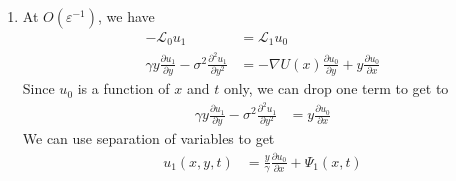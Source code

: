 \documentclass[12pt]{article}
\theoremstyle{plain}
\theoremstyle{definition}
\theoremstyle{remark}
\begin{document}
\begin{enumerate}
\begin{enumerate}
      \item %
        At $O(\varepsilon^{-1})$, we have
        \begin{align*}
          -\mathscr{L}_0u_1 &= \mathscr{L}_1u_0 \\
          \gamma y \frac{\partial u_1}{\partial y}
            -\sigma^2 \frac{\partial^2 u_1}{\partial y^2}
            &= -\nabla U(x) \frac{\partial u_0}{\partial y}
            + y \frac{\partial u_0}{\partial x}
        \end{align*}
        Since $u_0$ is a function of $x$ and $t$ only, we can drop one
        term to get to
        \begin{align*}
          \gamma y \frac{\partial u_1}{\partial y}
            -\sigma^2 \frac{\partial^2 u_1}{\partial y^2}
            &= y \frac{\partial u_0}{\partial x}
        \end{align*}
        We can use separation of variables to get
        \begin{align*}
          u_1(x,y,t) &= \frac{y}{\gamma} \frac{\partial u_0}{\partial x} + \Psi_1(x,t)
        \end{align*}


\end{enumerate}
\end{enumerate}
\end{document}
